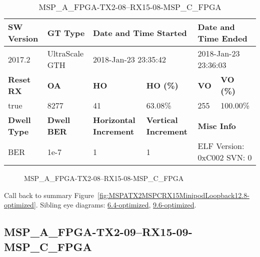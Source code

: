 \begin{table}[h]
\centering
\caption{MSP\_A\_FPGA-TX2-08--RX15-08-MSP\_C\_FPGA}
\label{tab:MSPAFPGATX208RX1508MSPCFPGA12.8-optimized}
\begin{tabular}{@{}|l|l|l|l|l|l|@{}}
\toprule
\textbf{SW Version}                & \textbf{GT Type}   & \multicolumn{2}{l|}{\textbf{Date and Time Started}}            & \multicolumn{2}{l|}{\textbf{Date and Time Ended}}        \\ \midrule
2017.2                       & UltraScale GTH          & \multicolumn{2}{l|}{2018-Jan-23 23:35:42}                   & \multicolumn{2}{l|}{2018-Jan-23 23:36:03}               \\ \midrule
\textbf{Reset RX}                  & \textbf{OA} & \textbf{HO}   & \textbf{HO (\%)} & \textbf{VO} & \textbf{VO (\%)} \\ \midrule
true & 8277        & 41          & 63.08\%        & 255        & 100.00\%       \\ \midrule
\textbf{Dwell Type}                & \textbf{Dwell BER} & \textbf{Horizontal Increment} & \textbf{Vertical Increment}    & \multicolumn{2}{l|}{\textbf{Misc Info}}                  \\ \midrule
BER                            & 1e-7        & 1        & 1           & \multicolumn{2}{l|}{ELF Version: 0xC002 SVN: 0}                         \\ \bottomrule
\end{tabular}
\end{table}

\begin{figure}[h]
\caption{MSP\_A\_FPGA-TX2-08--RX15-08-MSP\_C\_FPGA} \label{fig:MSPAFPGATX208RX1508MSPCFPGA12.8-optimized}
\end{figure}

Call back to summary Figure~\ref{fig:MSPATX2MSPCRX15MinipodLoopback12.8-optimized}.
Sibling eye diagrams: \hyperref[sec:MSPAFPGATX208RX1508MSPCFPGA6.4-optimized]{6.4-optimized}, \hyperref[sec:MSPAFPGATX208RX1508MSPCFPGA9.6-optimized]{9.6-optimized}.

\clearpage
\newpage


\subsection{MSP\_A\_FPGA-TX2-09--RX15-09-MSP\_C\_FPGA}\label{sec:MSPAFPGATX209RX1509MSPCFPGA12.8-optimized}

